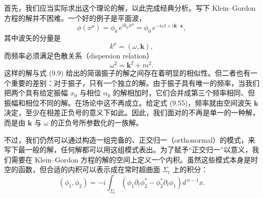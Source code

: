 首先，我们应当实际求出这个理论的解，以此完成经典分析。写下 Klein–Gordon 方程的解并不困难。一个好的例子是平面波，
\begin{equation*}
\phi(x^{\mu}) = \phi_0\, e^{ik_\mu x^\mu} = \phi_0\, e^{-i\omega t + i\mathbf{k}\cdot\mathbf{x}},
\tag{9.53}
\end{equation*}
其中波矢的分量是
\begin{equation*}
k^{\mu} = (\omega, \mathbf{k}),
\tag{9.54}
\end{equation*}
而频率必须满足色散关系（dispersion relation）
\begin{equation*}
\omega^2 = \mathbf{k}^2 + m^2.
\tag{9.55}
\end{equation*}
这样的解与式 (9.9) 给出的简谐振子的解之间存在着明显的相似性。但二者也有一个重要的差别：对于振子，只有一个独立的解。由于振子具有唯一的频率，当我们把两个具有给定振幅 $x_0$ 与相位 $\alpha_0$ 的解相加时，它们合并成第三个频率相同、但振幅和相位不同的解。在场论中这不再成立。给定式 (9.55)，频率就由空间波矢 $\mathbf{k}$ 决定，至少在相差正负号的意义下如此。因此，我们面对的不再是单一的一种解，而是由 $\mathbf{k}$ 与 $\omega$ 的正负号所参数化的一族解。

不过，我们仍然可以通过构造一组完备的、正交归一（orthonormal）的模式，来写下最一般的解，任何解都可以用这组模式表出。为了赋予“正交归一”以意义，我们需要在 Klein–Gordon 方程的解的空间上定义一个内积。虽然这些模式本身是时空的函数，但合适的内积可以表示成在常时超曲面 $\Sigma_t$ 上的积分：
\begin{equation*}
(\phi_1, \phi_2) = -i\int_{\Sigma_t}\left(\phi_1\partial_t\phi_2^{*} - \phi_2^{*}\partial_t\phi_1\right) d^{\,n-1}x.
\tag{9.56}
\end{equation*}

